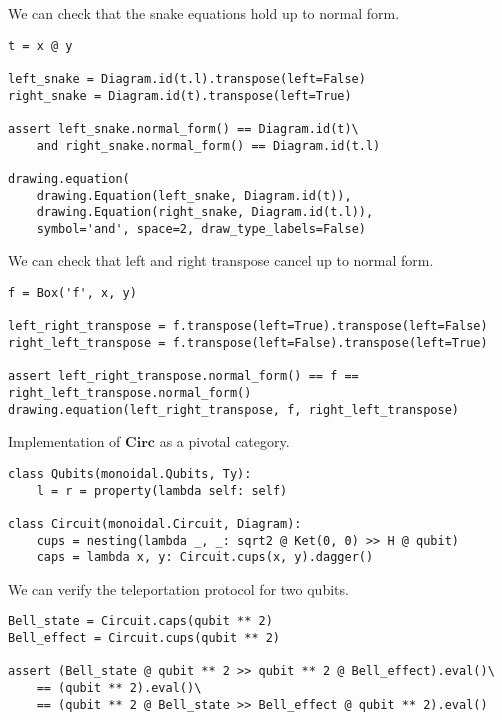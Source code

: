 \begin{example}
We can check that the snake equations hold up to normal form.

\begin{verbatim}
t = x @ y

left_snake = Diagram.id(t.l).transpose(left=False)
right_snake = Diagram.id(t).transpose(left=True)

assert left_snake.normal_form() == Diagram.id(t)\
    and right_snake.normal_form() == Diagram.id(t.l)

drawing.equation(
    drawing.Equation(left_snake, Diagram.id(t)),
    drawing.Equation(right_snake, Diagram.id(t.l)),
    symbol='and', space=2, draw_type_labels=False)
\end{verbatim}

\end{example}

\begin{example}
We can check that left and right transpose cancel up to normal form.

\begin{verbatim}
f = Box('f', x, y)

left_right_transpose = f.transpose(left=True).transpose(left=False)
right_left_transpose = f.transpose(left=False).transpose(left=True)

assert left_right_transpose.normal_form() == f == right_left_transpose.normal_form()
drawing.equation(left_right_transpose, f, right_left_transpose)
\end{verbatim}

\end{example}

\begin{python}\label{example:pivotal-circuit}
{\normalfont Implementation of $\mathbf{Circ}$ as a pivotal category.}

\begin{verbatim}
class Qubits(monoidal.Qubits, Ty):
    l = r = property(lambda self: self)

class Circuit(monoidal.Circuit, Diagram):
    cups = nesting(lambda _, _: sqrt2 @ Ket(0, 0) >> H @ qubit)
    caps = lambda x, y: Circuit.cups(x, y).dagger()
\end{verbatim}
\end{python}

\begin{example}
We can verify the teleportation protocol for two qubits.

\begin{verbatim}
Bell_state = Circuit.caps(qubit ** 2)
Bell_effect = Circuit.cups(qubit ** 2)

assert (Bell_state @ qubit ** 2 >> qubit ** 2 @ Bell_effect).eval()\
    == (qubit ** 2).eval()\
    == (qubit ** 2 @ Bell_state >> Bell_effect @ qubit ** 2).eval()
\end{verbatim}
\end{example}

